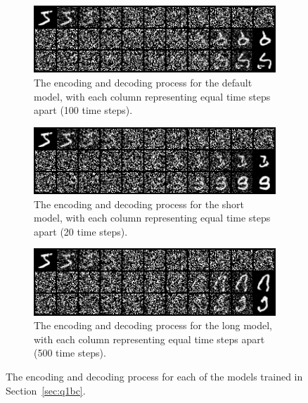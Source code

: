 \begin{figure}
\centering
\begin{subfigure}{0.8\textwidth}
    \centering
    \includegraphics[width=1\textwidth]{./figures/q1b_def_model_nd}
    \caption{The encoding and decoding process for the default model, with each column representing equal time steps
        apart (100 time steps).}
    \label{fig:q1b_def_model_nd}
\end{subfigure}%
\hfill
\begin{subfigure}{0.8\textwidth}
    \centering
    \includegraphics[width=1\textwidth]{./figures/q1b_short_model_nd}
    \caption{The encoding and decoding process for the short model, with each column representing equal time steps
        apart (20 time steps).}
    \label{fig:q1b_short_model_nd}
\end{subfigure}
\hfill
\begin{subfigure}{0.8\textwidth}
    \centering
    \includegraphics[width=1\textwidth]{./figures/q1b_long_model_nd}
    \caption{The encoding and decoding process for the long model, with each column representing equal time steps
        apart (500 time steps).}
    \label{fig:q1b_long_model_nd}
\end{subfigure}
\caption{The encoding and decoding process for each of the models trained in Section~\eqref{sec:q1bc}.}
\label{fig:q1b_short_long_model_nd}
\end{figure}

